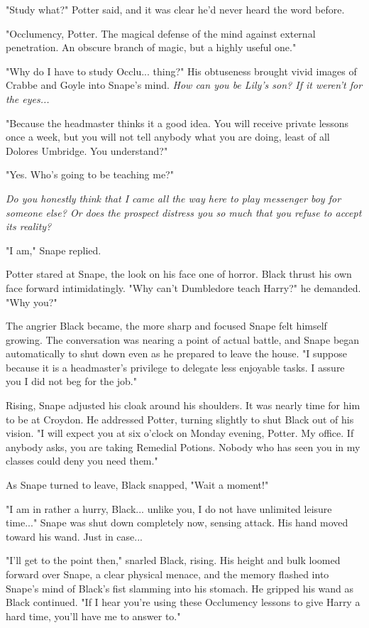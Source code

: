 \documentclass[a4paper,11pt]{article}
\begin{document}
"Study what?" Potter said, and it was clear he'd never heard the word before.

"Occlumency, Potter. The magical defense of the mind against external penetration. An obscure branch of magic, but a highly useful one."

"Why do I have to study Occlu... thing?" His obtuseness brought vivid images of Crabbe and Goyle into Snape's mind. \emph{How can you be Lily's son? If it weren't for the eyes...}

"Because the headmaster thinks it a good idea. You will receive private lessons once a week, but you will not tell anybody what you are doing, least of all Dolores Umbridge. You understand?"

"Yes. Who's going to be teaching me?"

\emph{Do you honestly think that I came all the way here to play messenger boy for someone else? Or does the prospect distress you so much that you refuse to accept its reality?}

"I am," Snape replied.

Potter stared at Snape, the look on his face one of horror. Black thrust his own face forward intimidatingly. "Why can't Dumbledore teach Harry?" he demanded. "Why you?"

The angrier Black became, the more sharp and focused Snape felt himself growing. The conversation was nearing a point of actual battle, and Snape began automatically to shut down even as he prepared to leave the house. "I suppose because it is a headmaster's privilege to delegate less enjoyable tasks. I assure you I did not beg for the job."

Rising, Snape adjusted his cloak around his shoulders. It was nearly time for him to be at Croydon. He addressed Potter, turning slightly to shut Black out of his vision. "I will expect you at six o'clock on Monday evening, Potter. My office. If anybody asks, you are taking Remedial Potions. Nobody who has seen you in my classes could deny you need them."

As Snape turned to leave, Black snapped, "Wait a moment!"

"I am in rather a hurry, Black... unlike you, I do not have unlimited leisure time..." Snape was shut down completely now, sensing attack. His hand moved toward his wand. Just in case...

"I'll get to the point then," snarled Black, rising. His height and bulk loomed forward over Snape, a clear physical menace, and the memory flashed into Snape's mind of Black's fist slamming into his stomach. He gripped his wand as Black continued. "If I hear you're using these Occlumency lessons to give Harry a hard time, you'll have me to answer to."
\end{document}
